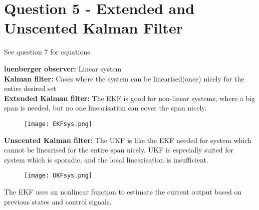 \chapter{Question 5 - Extended and Unscented Kalman Filter}

See question 7 for equations

\textbf{luenberger observer:} Linear system \\
\textbf{Kalman filter:} Cases where the system can be linearised(once) nicely for the entire desired set \\
\textbf{Extended Kalman filter:} The EKF is good for non-linear systems, where a big span is needed, but no one linearisation can cover the span nicely. \\
\begin{figure}[H]
        \texttt{[image: EKFsys.png]}
\end{figure}
\textbf{Unscented Kalman filter:} The UKF is like the EKF needed for system which cannot be linearised for the entire span nicely. UKF is especially suited for system which is sporadic, and the local linearisation is insufficient.
\begin{figure}[H]
        \texttt{[image: UKFsys.png]}
\end{figure}

The EKF uses an nonlinear function to estimate the current output based on previous states and control signals.
